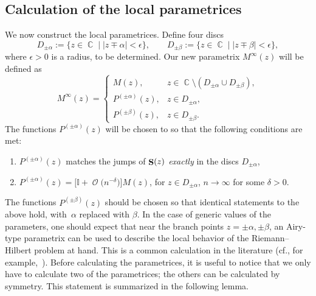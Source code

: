 \documentclass[10pt,a4paper]{amsart}
\DeclareMathOperator{\CC}{\mathbb{C}}
\DeclareMathOperator{\OO}{\mathcal{O}}
\DeclareMathOperator{\boldS}{{\bf S}}
\numberwithin{equation}{section}
\begin{document}
\subsection{Calculation of the local parametrices}
We now construct the local parametrices. Define four discs
 \begin{equation*}
 D_{\pm\alpha} := \{z\in\CC \mid |z\mp\alpha| < \epsilon\},\qquad D_{\pm \beta} := \{z\in\CC \mid |z\mp\beta| < \epsilon\},
 \end{equation*}
where $\epsilon>0$ is a radius, to be determined. Our new parametrix $M^{\infty}(z)$ will be defined as
 \begin{equation*}
 M^{\infty}(z) =
 \begin{cases}
 M(z), & z\in \CC \setminus (D_{\pm\alpha} \cup D_{\pm\beta}),\\
 P^{(\pm\alpha)}(z), & z\in D_{\pm\alpha},\\
 P^{(\pm\beta)}(z), & z\in D_{\pm\beta}.
 \end{cases}
 \end{equation*}
The functions $P^{(\pm \alpha)}(z)$ will be chosen to so that the following conditions are met:
 \begin{enumerate}\itemsep=0pt
 \item[$(1)$] $P^{(\pm \alpha)}(z)$ matches the jumps of $\boldS(z)$ \textit{exactly} in the discs $D_{\pm \alpha}$,
 \item[$(2)$] $P^{(\pm \alpha)}(z) = \bigl[\mathbb{I} + \OO\bigl(n^{-\delta}\bigr)\bigr] M(z)$, for $z\in D_{\pm \alpha}$, $n\to \infty$ for some $\delta >0$.
 \end{enumerate}
The functions $P^{(\pm \beta)}(z)$ should be chosen so that identical statements to the above hold, with~$\alpha$ replaced with $\beta$.
In the case of generic values of the parameters, one should expect that near the branch points $z=\pm\alpha,\pm \beta$, an Airy-type parametrix can be used to describe the local behavior of the Riemann--Hilbert problem at hand. This is a common calculation in the literature (cf., for example,~\cite{DKMVZ}).
Before calculating the parametrices, it is useful to notice that we only have to calculate two of the parametrices; the others can be calculated
by symmetry. This statement is summarized in the following lemma.
\end{document}
